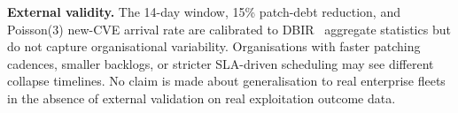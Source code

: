 \textbf{External validity.} The 14-day window, 15\% patch-debt reduction, and Poisson(3) new-CVE arrival rate are calibrated to DBIR~\cite{verizon2026dbir} aggregate statistics but do not capture organisational variability. Organisations with faster patching cadences, smaller backlogs, or stricter SLA-driven scheduling may see different collapse timelines. No claim is made about generalisation to real enterprise fleets in the absence of external validation on real exploitation outcome data.
